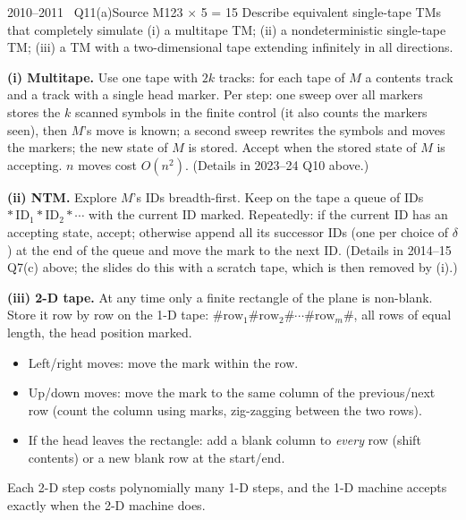 \documentclass[11pt,a4paper]{article}
\begin{document}
\begin{question}{2010--2011 \textbullet\ Q11(a)}{Source M12}{3 $\times$ 5 = 15}
Describe equivalent single-tape TMs that completely simulate (i) a multitape TM; (ii) a nondeterministic single-tape TM; (iii) a TM with a two-dimensional tape extending infinitely in all directions.
\end{question}
\begin{solution}
\textbf{(i) Multitape.} Use one tape with $2k$ tracks: for each tape of $M$ a contents track and a track with a single head marker. Per step: one sweep over all markers stores the $k$ scanned symbols in the finite control (it also counts the markers seen), then $M$'s move is known; a second sweep rewrites the symbols and moves the markers; the new state of $M$ is stored. Accept when the stored state of $M$ is accepting. $n$ moves cost $O(n^2)$. (Details in 2023--24 Q10 above.)

\textbf{(ii) NTM.} Explore $M$'s IDs breadth-first. Keep on the tape a queue of IDs $\ast\,\text{ID}_1\ast\text{ID}_2\ast\cdots$ with the current ID marked. Repeatedly: if the current ID has an accepting state, accept; otherwise append all its successor IDs (one per choice of $\delta$) at the end of the queue and move the mark to the next ID. (Details in 2014--15 Q7(c) above; the slides do this with a scratch tape, which is then removed by (i).)

\textbf{(iii) 2-D tape.} At any time only a finite rectangle of the plane is non-blank. Store it row by row on the 1-D tape: $\#\text{row}_1\#\text{row}_2\#\cdots\#\text{row}_m\#$, all rows of equal length, the head position marked.
\begin{itemize}
\item Left/right moves: move the mark within the row.
\item Up/down moves: move the mark to the same column of the previous/next row (count the column using marks, zig-zagging between the two rows).
\item If the head leaves the rectangle: add a blank column to \emph{every} row (shift contents) or a new blank row at the start/end.
\end{itemize}
Each 2-D step costs polynomially many 1-D steps, and the 1-D machine accepts exactly when the 2-D machine does.


\end{solution}
\end{document}
